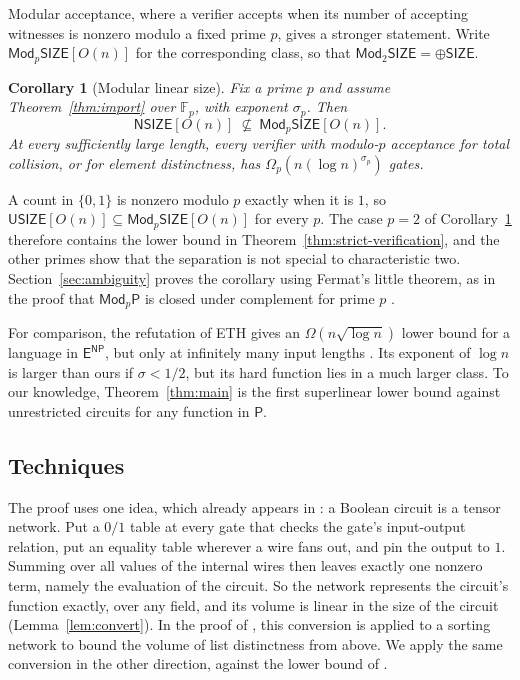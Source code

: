 \documentclass[11pt]{article}
\newtheorem{corollary}[theorem]{Corollary}
\theoremstyle{definition}
\theoremstyle{remark}
\newcommand{\F}{\mathbb{F}}
\newcommand{\USIZE}{\mathsf{USIZE}}
\newcommand{\NSIZE}{\mathsf{NSIZE}}
\newcommand{\ModSIZE}[1]{\mathsf{Mod}_{#1}\mathsf{SIZE}}
\newcommand{\ENP}{\mathsf{E}^{\mathsf{NP}}}
\begin{document}
Modular acceptance, where a verifier accepts when its number of accepting
witnesses is nonzero modulo a fixed prime $p$, gives a stronger
statement. Write $\ModSIZE{p}[O(n)]$ for the corresponding class, so that
$\ModSIZE{2}=\oplus\mathsf{SIZE}$.

\begin{corollary}[Modular linear size]\label{cor:modular-class}
Fix a prime $p$ and assume Theorem~\ref{thm:import} over $\F_p$, with
exponent $\sigma_p$. Then
\[
                  \NSIZE[O(n)]\ \not\subseteq\ \ModSIZE{p}[O(n)] .
\]
At every sufficiently large length, every verifier with modulo-$p$
acceptance for total collision, or for element distinctness, has
$\Omega_p(n(\log n)^{\sigma_p})$ gates.
\end{corollary}

A count in $\{0,1\}$ is nonzero modulo $p$ exactly when it is $1$, so
$\USIZE[O(n)]\subseteq\ModSIZE{p}[O(n)]$ for every $p$. The case $p=2$ of
Corollary~\ref{cor:modular-class} therefore contains the lower bound in
Theorem~\ref{thm:strict-verification}, and the other primes show that
the separation is not special to characteristic two.
Section~\ref{sec:ambiguity} proves the corollary using Fermat's little
theorem, as in the proof that $\mathsf{Mod}_p\mathsf P$ is closed under
complement for prime $p$ \cite{BG}.

For comparison, the refutation of ETH \cite{ETH} gives an
$\Omega(n\sqrt{\log n})$ lower bound for a language in $\ENP$, but only at
infinitely many input lengths \cite[Corollary~1.4]{ETH}. Its exponent of
$\log n$ is larger than ours if $\sigma<1/2$, but its hard function lies
in a much larger class. To our knowledge, Theorem~\ref{thm:main} is the
first superlinear lower bound against unrestricted circuits for any
function in $\mathsf{P}$.

\subsection{Techniques}
The proof uses one idea, which already appears in \cite{OAI}: a Boolean
circuit is a tensor network. Put a $0/1$ table at every gate that checks
the gate's input-output relation, put an equality table wherever a wire
fans out, and pin the output to $1$. Summing over all values of the
internal wires then leaves exactly one nonzero term, namely the
evaluation of the circuit. So the network represents the circuit's
function exactly, over any field, and its volume is linear in the size
of the circuit (Lemma~\ref{lem:convert}). In the proof of
\cite[Proposition~2.3]{OAI}, this conversion is applied to a sorting
network to bound the volume of list distinctness from above. We apply
the same conversion in the other direction, against the lower bound of
\cite[Theorem~2.2]{OAI}.
\end{document}
